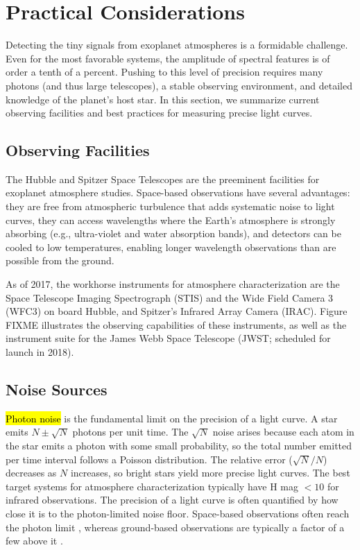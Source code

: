 \documentclass[graybox,natbib,nosecnum]{svmult}
\newcommand{\hbindex}[1]{\hl{#1}\index{#1}}  %
\begin{document}
\section{Practical Considerations}
Detecting the tiny signals from exoplanet atmospheres is a formidable challenge. Even for the most favorable systems, the amplitude of spectral features is of order a tenth of a percent. Pushing to this level of precision requires many photons (and thus large telescopes), a stable observing environment, and detailed knowledge of the planet's host star.  In this section, we summarize current observing facilities and best practices for measuring precise light curves.

\subsection{Observing Facilities}
The Hubble and Spitzer Space Telescopes are the preeminent facilities for exoplanet atmosphere studies.  Space-based observations have several advantages: they are free from atmospheric turbulence that adds systematic noise to light curves, they can access wavelengths where the Earth's atmosphere is strongly absorbing (e.g., ultra-violet and water absorption bands), and detectors can be cooled to low temperatures, enabling longer wavelength observations than are possible from the ground.  

As of 2017, the workhorse instruments for atmosphere characterization are the Space Telescope Imaging Spectrograph (STIS) and the Wide Field Camera 3 (WFC3) on board Hubble, and Spitzer's Infrared Array Camera (IRAC).  Figure FIXME illustrates the observing capabilities of these instruments, as well as the instrument suite for the James Webb Space Telescope (JWST; scheduled for launch in 2018).

\subsection{Noise Sources}
\hbindex{Photon noise} is the fundamental limit on the precision of a light curve. A star emits $N \pm \sqrt{N}$ photons per unit time. The $\sqrt{N}$ noise arises because each atom in the star emits a photon with some small probability, so the total number emitted per time interval follows a Poisson distribution. The relative error ($\sqrt{N}/N$) decreases as $N$ increases, so bright stars yield more precise light curves.  The best target systems for atmosphere characterization typically have H mag $< 10$ for infrared observations.  The precision of a light curve is often quantified by how close it is to the photon-limited noise floor. Space-based observations often reach the photon limit \citep{sing11, kreidberg14a, ingalls16}, whereas ground-based observations are typically a factor of a few above it \citep[e.g.][]{bean13}. %
\end{document}

